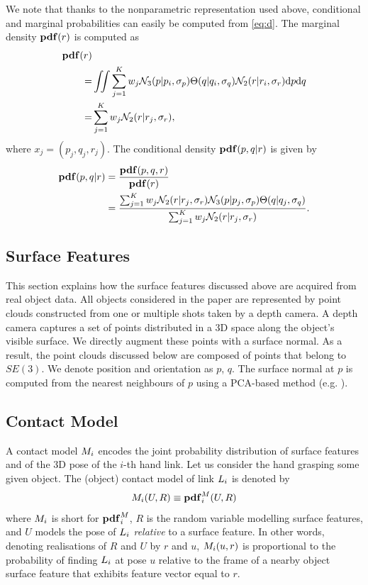 We note that thanks to the nonparametric representation used above, conditional and marginal probabilities can easily be computed from \eq\eqref{eq:d}. The marginal density $\mathbf{pdf}(r)$ is computed as
\begin{align}\label{eq:marginal}
\mathbf{pdf}(r) & \\
      = & \iint \sum_{j=1}^K w_j \mathcal{N}_3(p| p_i, \sigma_p) \Theta(q| q_i, \sigma_q) \mathcal{N}_2(r| r_i, \sigma_r) \textnormal{d}p\textnormal{d}q \\
      = &  \sum_{j=1}^K w_j \mathcal{N}_2(r| r_j, \sigma_r),
\end{align}
where $x_j = (p_j, q_j, r_j)$.
The  conditional density $\mathbf{pdf}(p,q|r)$ is given by
\begin{align}\label{eq:conditional}
\mathbf{pdf}(p,q|{r}) & = \frac{\mathbf{pdf}(p, q, {r})}{\mathbf{pdf}({r})} \\
                   & = \frac{\sum_{j=1}^K w_j \mathcal{N}_2({r}| r_j, \sigma_r) \mathcal{N}_3(p| p_j, \sigma_p) \Theta(q|q_j, \sigma_q)}{\sum_{j=1}^K w_j \mathcal{N}_2({r}| r_j, \sigma_r)}. 
\end{align}

\subsection{Surface Features}
\label{sec:surface_features}

This section explains how the surface features discussed above are acquired from real object data. All objects considered in the paper are represented by point clouds constructed from one or multiple shots taken by a depth camera. A depth camera captures a set of points distributed in a 3D space along the object's visible surface. We directly augment these points with a surface normal. As a result, the point clouds discussed below are composed of points that belong to $SE(3)$. We denote position and orientation as $p$, $q$. The surface normal at $p$ is computed from the nearest neighbours of $p$ using a PCA-based method (e.g. \cite{kanatani2005statistical}). 

\subsection{Contact Model}\label{sec:contact.model}

A contact model $M_i$ encodes the joint probability distribution of surface features and of the 3D pose of the $i$-th hand link. Let us consider the hand grasping some given object. The (object) contact model of link $L_i$ is denoted by
\begin{equation}\label{eq:M}
M_i(U, R) \equiv \mathbf{pdf}^M_i(U, R)
\end{equation}
where $M_i$ is short for $\mathbf{pdf}^M_i$, $R$ is the random variable modelling surface features, and $U$ models the pose of $L_i$ \emph{relative} to a surface feature. In other words, denoting realisations of $R$ and $U$ by $r$ and $u$, $M_i(u, r)$ is proportional to the probability of finding $L_i$ at pose $u$ relative to the frame of a nearby object surface feature that exhibits feature vector equal to $r$.

